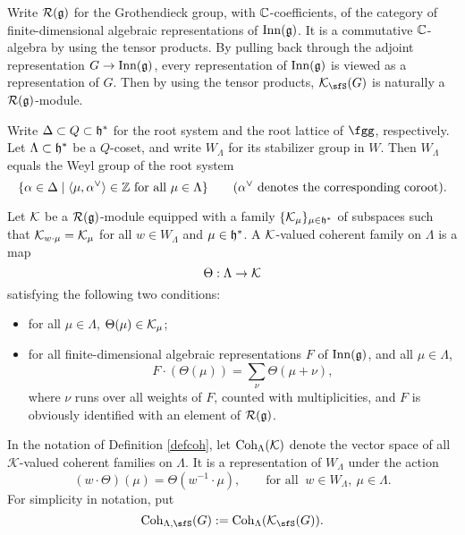 \documentclass[counting_main.tex]{subfiles}
\begin{document}
Write $\mathcal R(\mathfrak g)$ for the Grothendieck group, with $\mathbb{C}$-coefficients,  of the category of finite-dimensional algebraic representations of $\mathrm{Inn}(\mathfrak g)$. It is a commutative $\mathbb{C}$-algebra by using the tensor products. By pulling back through the adjoint representation $G\rightarrow \mathrm{Inn}(\mathfrak g)$, every representation of $\mathrm{Inn}(\mathfrak g)$ is viewed as a representation of $G$. Then by using the tensor products, $\CK_\sfS(G)$ is naturally a $\mathcal R(\mathfrak g)$-module.






Write $\Delta\subset Q\subset \mathfrak h^*$ for the root system and the root lattice of $\fgg$, respectively. Let $\Lambda\subset \mathfrak h^*$ be a $Q$-coset, and write $W_\Lambda$ for its stabilizer group in $W$. Then $W_\Lambda$ equals the Weyl group of the root system
\[
  \{\alpha \in \Delta\mid \langle \mu, \alpha^\vee\rangle \in \mathbb{Z}\textrm{ for all }\mu\in \Lambda\}\qquad (\alpha^\vee \textrm{ denotes the corresponding coroot}).
\]


\begin{defn}\label{defcoh}
  Let ${\mathcal {K}}$  be a $\mathcal R(\mathfrak g)$-module equipped with a family $\{{\mathcal {K}}_\mu\}_{\mu\in  \mathfrak h^*}$ of subspaces such that ${\mathcal {K}}_{w\cdot \mu}={\mathcal {K}}_\mu$ for all $w\in W_\Lambda$ and $\mu\in \mathfrak h^*$.
  A ${\mathcal {K}}$-valued coherent family on $\Lambda$ is a map
  \[
    \Theta: \Lambda\rightarrow \CK%
  \]
  satisfying the following two conditions:
  \begin{itemize}
  \item for all $\mu\in \Lambda$,
    $\Theta(\mu)\in {\mathcal {K}}_\mu$;
  \item for all finite-dimensional algebraic representations $F$ of $\mathrm{Inn}(\mathfrak g)$, and all $\mu\in \Lambda$,
      \[
      F\cdot (\Theta(\mu)) = \sum_{\nu} \Theta(\mu+\nu),
  \]
  where $\nu$ runs over all weights of $F$, counted with multiplicities, and $F$ is obviously identified with an element of $\mathcal R(\mathfrak g)$.
  \end{itemize}
  \end{defn}


In the notation of Definition \ref{defcoh},   let $\mathrm{Coh}_{\Lambda}({\mathcal {K}})$ denote the vector space  of all $\mathcal K$-valued coherent families
  on $\Lambda$. It is a representation of  $W_{\Lambda}$ under the action
  \[
    (w\cdot \Theta)(\mu) = \Theta(w^{-1}\cdot \mu), \qquad \textrm{for all }\  w\in W_\Lambda, \ \mu\in \Lambda.
  \]
For simplicity in notation, put
\[
\Coh_{\Lambda,\sfS}(G):=\Coh_{\Lambda}(\CK_\sfS(G)).
\]
\end{document}
